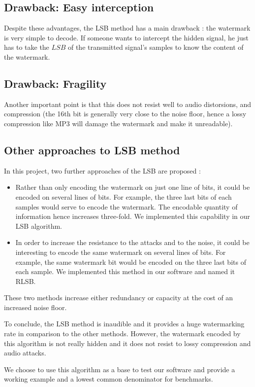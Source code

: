 \subsection{Drawback: Easy interception}
Despite these advantages, the LSB method has a main drawback : the watermark is very simple to decode. If someone wants to intercept the hidden signal, he just has to take the $LSB$ of the transmitted signal's samples to know the content of the watermark.  

\subsection{Drawback: Fragility}
Another important point is that this does not resist well to audio distorsions, and compression (the 16th bit is generally very close to the noise floor, hence a lossy compression like MP3 will damage the watermark and make it unreadable). 

\subsection{Other approaches to LSB method}
In this project, two further approaches of the \ac{LSB} are proposed :
\begin{itemize}
\item Rather than only encoding the watermark on just one line of bits, it could be encoded on several lines of bits. For example, the three last bits of each samples would serve to encode the watermark. The encodable quantity of information hence increases three-fold. We implemented this capability in our \ac{LSB} algorithm.
\item In order to increase the resistance to the attacks and to the noise, it could be interesting to encode the same watermark on several lines of bits. For example, the same watermark bit would be encoded on the three last bits of each sample. We implemented this method in our software and named it \ac{RLSB}.
\end{itemize} 

These two methods increase either redundancy or capacity at the cost of an increased noise floor.

To conclude, the \ac{LSB} method is inaudible and it provides a huge watermarking rate in comparison to the other methods. However, the watermark encoded by this algorithm is not really hidden and it does not resist to lossy compression and audio attacks.

We choose to use this algorithm as a base to test our software and provide a working example and a lowest common denominator for benchmarks.
